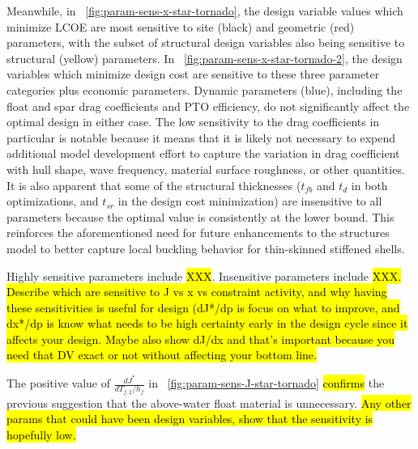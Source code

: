 Meanwhile, in \figureautorefname~\ref{fig:param-sens-x-star-tornado}, the design variable values which minimize LCOE are most sensitive to site (black) and geometric (red) parameters, with the subset of structural design variables also being sensitive to structural (yellow) parameters.
In \figureautorefname~\ref{fig:param-sens-x-star-tornado-2}, the design variables which minimize design cost are sensitive to these three parameter categories plus economic parameters.
Dynamic parameters (blue), including the float and spar drag coefficients and PTO efficiency, do not significantly affect the optimal design in either case.
The low sensitivity to the drag coefficients in particular is notable because it means that it is likely not necessary to expend additional model development effort to capture the variation in drag coefficient with hull shape, wave frequency, material surface roughness, or other quantities.
It is also apparent that some of the structural thicknesses ($t_{fb}$ and $t_d$ in both optimizations, and $t_{sr}$ in the design cost minimization) are insensitive to all parameters because the optimal value is consistently at the lower bound.
This reinforces the aforementioned need for future enhancements to the structures model to better capture local buckling behavior for thin-skinned stiffened shells.

Highly sensitive parameters include \hl{XXX}.
Insensitive parameters include \hl{XXX.
Describe which are sensitive to J vs x vs constraint activity, and why having these sensitivities is useful for design (dJ*/dp is focus on what to improve, and dx*/dp is know what needs to be high certainty early in the design cycle since it affects your design.
Maybe also show dJ/dx and that's important because you need that DV exact or not without affecting your bottom line. }


The positive value of $\frac{dJ^*}{dT_{f,2}/h_f}$ in \figureautorefname~\ref{fig:param-sens-J-star-tornado} \hl{confirms} the previous suggestion that the above-water float material is unnecessary.
\hl{Any other params that could have been design variables, show that the sensitivity is hopefully low.}


